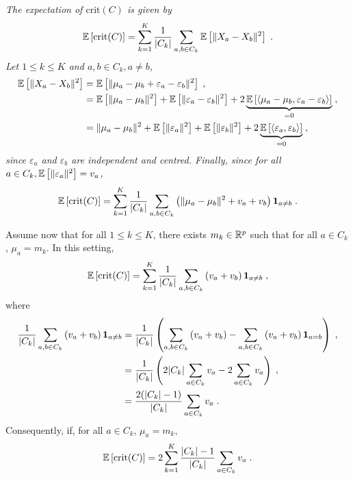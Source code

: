 \begin{enumerate}
\vspace{.2cm}

{\em
The expectation of $\textrm{crit}(C)$ is given by
$$
\mathbb{E} \left[ \textrm{crit}(C) \right] = \sum_{k=1}^K \frac{1}{|C_k|}\sum_{a, b\in C_{k}} \mathbb{E} \left[ \| X_a-X_b \|^2 \right]\;.
$$
Let $1\leqslant k \leqslant K$ and $a, b \in C_k, a \neq b$,
\begin{align*}
\mathbb{E} \left[ \| X_a-X_b \|^2 \right] & = \mathbb{E} \left[ \| \mu_a - \mu_b + \varepsilon_a - \varepsilon_b \|^2\right]\;,\\
& = \mathbb{E} \left[ \| \mu_a - \mu_b\|^2 \right]   + \mathbb{E} \left[ \| \varepsilon_a - \varepsilon_b \|^2 \right] 
+ 2  \underbrace{\mathbb{E} \left[  \langle \mu_a - \mu_b, \varepsilon_a - \varepsilon_b \rangle \right]}_{=0}\;,\\
& = \| \mu_a - \mu_b\|^2 + \mathbb{E} \left[ \| \varepsilon_a \|^2 \right] + \mathbb{E} \left[ \| \varepsilon_b \|^2 \right] + 2 \underbrace{\mathbb{E} \left[ \langle \varepsilon_a, \varepsilon_b \rangle \right]}_{=0}\;,
\end{align*}
since $\varepsilon_a$ and $\varepsilon_b$ are independent and centred. Finally, since for all $a \in C_k, \mathbb{E} \left[ \| \varepsilon_a \|^2 \right] = v_a$, 
$$
\mathbb{E} \left[ \textrm{crit}(C) \right] = \sum_{k=1}^K \frac{1}{|C_k|}\sum_{a, b\in C_{k}} \left( \| \mu_a - \mu_b\|^2 + v_a + v_b \right) {\bf 1}_{a \neq b}\;.
$$

Assume now that for all $1\leqslant k \leqslant K$, there exists $m_k\in\mathbb{R}^p$ such that  for all $a\in C_k$, $\mu_a = m_k$. In this setting, 
$$
\mathbb{E} \left[ \textrm{crit}(C) \right]  = \sum_{k=1}^K \frac{1}{|C_k|}\sum_{a, b\in C_{k}} \left( v_a + v_b \right) {\bf 1}_{a \neq b} \;,
$$
where 
\begin{align*}
\frac{1}{|C_k|}\sum_{a, b\in C_{k}} \left( v_a + v_b \right) {\bf 1}_{a \neq b} &= \frac{1}{|C_k|} \left( \sum_{a, b\in C_{k}} \left( v_a + v_b \right)  - \sum_{a, b\in C_{k}} \left( v_a + v_b \right) {\bf 1}_{a = b} \right)\;, \\
& = \frac{1}{|C_k|} \left( 2 |C_k| \sum_{a \in C_{k}} v_a - 2 \sum_{a \in C_{k}} v_a \right)\;,\\
& = \frac{2 (|C_k|-1)}{|C_k|} \sum_{a \in C_{k}} v_a\;.
\end{align*}
Consequently, if, for all $a \in C_k$, $\mu_a = m_k$,
$$
\mathbb{E} \left[ \textrm{crit}(C) \right]  = 2\sum_{k=1}^K \frac{|C_k|-1}{|C_k|} \sum_{a \in C_{k}} v_a\;.
$$ 
}
\end{enumerate}



